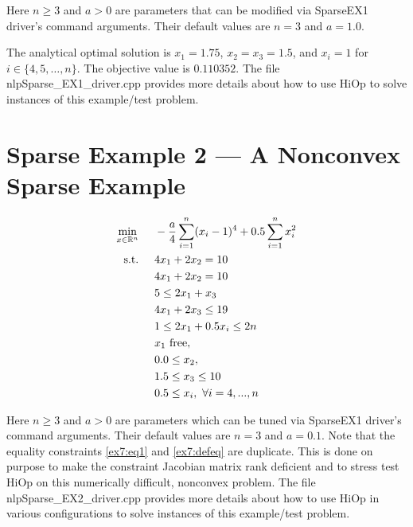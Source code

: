\documentclass[11pt,letterpaper]{article}
\begin{document}
Here $n\geq3$ and $a>0$ are parameters that can be modified via SparseEX1 driver's command arguments. Their default values are $n=3$ and $a=1.0$.

The analytical optimal solution is  $x_1=1.75$, $x_2=x_3=1.5$, and $x_i=1$ for $i\in \{4,5,\ldots,n\}$. The objective value is $0.110352$. The file nlpSparse\_EX1\_driver.cpp provides more details about how to use HiOp to solve instances of this example/test problem.

\section{Sparse Example 2 --- A Nonconvex Sparse Example}
\begin{align}
    &&&&\min_{x\in\mathbb{R}^n} & \hspace{0.5cm} -\frac{a}{4}\sum_{i=1}^{n} (x_i-1)^4 + 0.5\sum_{i=1}^{n} x_i^2&&&& \label{ex7:obj}\\
    &&&&\textnormal{s.t.} &\hspace{0.5cm}  4x_1+2x_2 = 10 &&&& \label{ex7:eq1}\\
    &&&&& \hspace{0.5cm}  4x_1+2x_2 = 10 &&&& \label{ex7:defeq}\\
    &&&&& \hspace{0.5cm}  5 \leq  2x_1 + x_3                 &&&& \label{ex7:ineq1}\\
    &&&&& \hspace{0.5cm}          4x_1      + 2x_3   \leq 19 &&&& \label{ex7:defineq}\\
    &&&&& \hspace{0.5cm}  1 \leq  2x_1      + 0.5x_i \leq 2n &&&& \label{ex7:ineq2}\\
    &&&&& \hspace{0.5cm}  x_1~\textnormal{free}, &&&& \label{ex7:varb1}\\
    &&&&& \hspace{0.5cm}  0.0 \leq x_2, &&&& \label{ex7:varb2}\\
    &&&&& \hspace{0.5cm}  1.5 \leq x_3 \leq 10  &&&& \label{ex7:varb3}\\
    &&&&& \hspace{0.5cm}  0.5 \leq x_i, \ \forall i=4,...,n    &&& \label{ex7:varb4}
\end{align}

Here $n\geq3$ and $a>0$ are parameters which can be tuned via SparseEX1 driver's command arguments. Their default values are  $n=3$ and $a=0.1$. Note that the equality constraints \eqref{ex7:eq1} and \eqref{ex7:defeq} are duplicate. This is done on purpose to make the constraint Jacobian matrix rank deficient and to stress test HiOp on this numerically difficult, nonconvex problem. The file nlpSparse\_EX2\_driver.cpp provides more details about how to use HiOp in various configurations to solve instances of this example/test problem.


\end{document}
